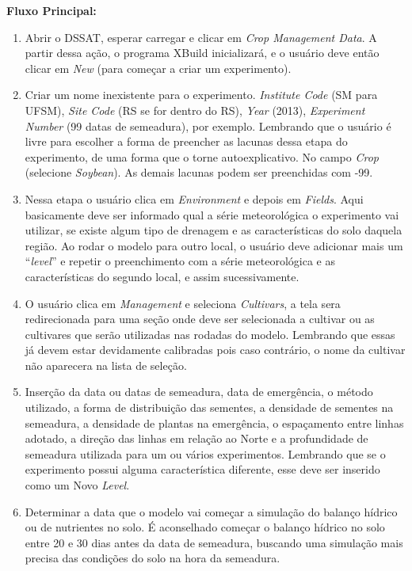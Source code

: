\documentclass[tg]{mdtufsm}
\begin{document}
            	{\bf Fluxo Principal:}
                	\begin{enumerate}
                		\item  Abrir o DSSAT, esperar carregar e clicar em \emph{Crop Management Data}. A partir dessa ação, o programa XBuild inicializará, e o usuário deve então clicar em \emph{New} (para começar a criar um experimento).
                		\item  Criar um nome inexistente para o experimento. \emph{Institute Code} (SM para UFSM), \emph{Site Code} (RS se for dentro do RS), \emph{Year} (2013), \emph{Experiment Number} (99 datas de semeadura), por exemplo. Lembrando que o usuário é livre para escolher a forma de preencher as lacunas dessa etapa do experimento, de uma forma que o torne autoexplicativo. No campo \emph{Crop} (selecione \emph{Soybean}). As demais lacunas podem ser preenchidas com -99.
                		\item Nessa etapa o usuário clica em \emph{Environment} e depois em \emph{Fields}. Aqui basicamente deve ser informado qual a série meteorológica o experimento vai utilizar, se existe algum tipo de drenagem e as características do solo daquela região. Ao rodar o modelo para outro local, o usuário deve adicionar mais um “\emph{level}” e repetir o preenchimento com a série meteorológica e as características do segundo local, e assim sucessivamente.
                		\item O usuário clica em \emph{Management} e seleciona \emph{Cultivars}, a tela sera redirecionada para uma seção onde deve ser selecionada a cultivar ou as cultivares que serão utilizadas nas rodadas do modelo. Lembrando que essas já devem estar devidamente calibradas pois caso contrário, o nome da cultivar não aparecera na lista de seleção.
                		\item Inserção da data ou datas de semeadura, data de emergência, o método utilizado, a forma de distribuição das sementes, a densidade de sementes na semeadura, a densidade de plantas na emergência, o espaçamento entre linhas adotado, a direção das linhas em relação ao Norte e a profundidade de semeadura utilizada para um ou vários experimentos. Lembrando que se o experimento possui alguma característica diferente, esse deve ser inserido como um Novo \emph{Level}.
                		\item Determinar a data que o modelo vai começar a simulação do balanço hídrico ou de nutrientes no solo. É aconselhado começar o balanço hídrico no solo entre 20 e 30 dias antes da data de semeadura, buscando uma simulação mais precisa das condições do solo na hora da semeadura.

\end{enumerate}
\end{document}
